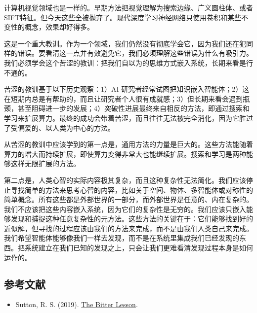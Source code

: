 计算机视觉领域也是一样的。早期方法把视觉理解为搜索边缘、广义圆柱体、或者SIFT特征。但今天这些全被抛弃了。现代深度学习神经网络只使用卷积和某些不变性的概念，效果却好得多。

这是一个重大教训。作为一个领域，我们仍然没有彻底学会它，因为我们还在犯同样的错误。要看清这一点并有效避免它，我们必须理解这些错误为什么有吸引力。我们必须学会这个苦涩的教训：把我们自以为的思维方式嵌入系统，长期来看是行不通的。

苦涩的教训基于以下历史观察：1）AI 研究者经常试图把知识嵌入智能体；2）这在短期内总是有帮助的，而且让研究者个人很有成就感；3）但长期来看会遇到瓶颈，甚至阻碍进一步的发展；4）突破性进展最终来自相反的方法，即通过搜索和学习来扩展算力。最终的成功会带着苦涩，而且往往无法被完全消化，因为它胜过了受偏爱的、以人类为中心的方法。

从苦涩的教训中应该学到的第一点是，通用方法的力量是巨大的。这些方法能随着算力的增大而持续扩展，即使算力变得非常大也能继续扩展。搜索和学习是两种能够这样无限扩展的方法。

第二点是，人类心智的实际内容极其复杂，而且这种复杂性无法简化。我们应该停止寻找简单的方法来思考心智的内容，比如关于空间、物体、多智能体或对称性的简单概念。所有这些都是外部世界的一部分，而外部世界是任意的、内在复杂的。我们不应该把这些内容嵌入系统，因为它们的复杂性是无穷的。我们应该只嵌入能够发现和捕捉这种任意复杂性的元方法。这些方法的关键在于：它们能够找到好的近似解，但寻找的过程应该由我们的方法来完成，而不是由我们人类自己来完成。我们希望智能体能够像我们一样去发现，而不是在系统里集成我们已经发现的东西。把系统建立在我们已知的发现之上，只会让我们更难看清发现过程本身是如何运作的。

\FloatBarrier
{}
\hypertarget{ux53c2ux8003ux6587ux732e-5}{%
\subsection{参考文献}\label{ux53c2ux8003ux6587ux732e-5}}

\vspace{0.25em}
\begin{itemize}
\tightlist
\item
  Sutton, R. S. (2019). \href{http://www.incompleteideas.net/IncIdeas/BitterLesson.html}{The Bitter Lesson}.
\end{itemize}

\clearpage
